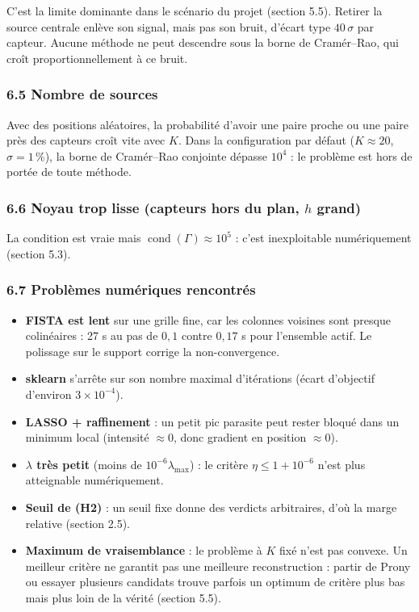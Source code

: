 \documentclass[
  french,
]{article}
\providecommand{\tightlist}{%
  \setlength{\itemsep}{0pt}\setlength{\parskip}{0pt}}
\begin{document}
C'est la limite dominante dans le scénario du projet (section 5.5).
Retirer la source centrale enlève son signal, mais pas son bruit,
d'écart type \(40\,\sigma\) par capteur. Aucune méthode ne peut
descendre sous la borne de Cramér--Rao, qui croît proportionnellement à
ce bruit.

\subsubsection{6.5 Nombre de sources}\label{nombre-de-sources}

Avec des positions aléatoires, la probabilité d'avoir une paire proche
ou une paire près des capteurs croît vite avec \(K\). Dans la
configuration par défaut (\(K\approx 20\), \(\sigma = 1\,\%\)), la borne
de Cramér--Rao conjointe dépasse \(10^4\) : le problème est hors de
portée de toute méthode.

\subsubsection{\texorpdfstring{6.6 Noyau trop lisse (capteurs hors du
plan, \(h\)
grand)}{6.6 Noyau trop lisse (capteurs hors du plan, h grand)}}\label{noyau-trop-lisse-capteurs-hors-du-plan-h-grand}

La condition est vraie mais \(\operatorname{cond}(\Gamma)\approx 10^5\)
: c'est inexploitable numériquement (section 5.3).

\subsubsection{6.7 Problèmes numériques
rencontrés}\label{probluxe8mes-numuxe9riques-rencontruxe9s}

\begin{itemize}
\tightlist
\item
  \textbf{FISTA est lent} sur une grille fine, car les colonnes voisines
  sont presque colinéaires : 27 s au pas de \(0{,}1\) contre \(0{,}17\)
  s pour l'ensemble actif. Le polissage sur le support corrige la
  non-convergence.
\item
  \textbf{sklearn} s'arrête sur son nombre maximal d'itérations (écart
  d'objectif d'environ \(3\times 10^{-4}\)).
\item
  \textbf{LASSO + raffinement} : un petit pic parasite peut rester
  bloqué dans un minimum local (intensité \(\approx 0\), donc gradient
  en position \(\approx 0\)).
\item
  \textbf{\(\lambda\) très petit} (moins de \(10^{-6}\lambda_{\max}\)) :
  le critère \(\eta\le 1+10^{-6}\) n'est plus atteignable numériquement.
\item
  \textbf{Seuil de (H2)} : un seuil fixe donne des verdicts arbitraires,
  d'où la marge relative (section 2.5).
\item
  \textbf{Maximum de vraisemblance} : le problème à \(K\) fixé n'est pas
  convexe. Un meilleur critère ne garantit pas une meilleure
  reconstruction : partir de Prony ou essayer plusieurs candidats trouve
  parfois un optimum de critère plus bas mais plus loin de la vérité
  (section 5.5).
\end{itemize}
\end{document}
